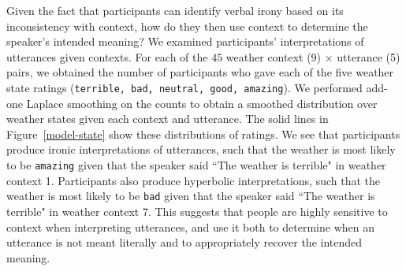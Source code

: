\documentclass[10pt,letterpaper]{article}
\begin{document}


Given the fact that participants can identify verbal irony based on its inconsistency with context, how do they then use context to determine the speaker's intended meaning? We examined participants' interpretations of utterances given contexts. For each of the $45$ weather context (9) $\times$ utterance (5) pairs, we obtained the number of participants who gave each of the five weather state ratings (\texttt{terrible, bad, neutral, good, amazing}). We performed add-one Laplace smoothing on the counts to obtain a smoothed distribution over weather states given each context and utterance. The solid lines in Figure~\ref{model-state} show these distributions of ratings. We see that participants produce ironic interpretations of utterances, such that the weather is most likely to be \texttt{amazing} given that the speaker said ``The weather is terrible" in weather context 1. Participants also produce hyperbolic interpretations, such that the weather is most likely to be \texttt{bad} given that the speaker said ``The weather is terrible" in weather context 7. This suggests that people are highly sensitive to context when interpreting utterances, and use it both to determine when an utterance is not meant literally and to appropriately recover the intended meaning. 
\end{document}
